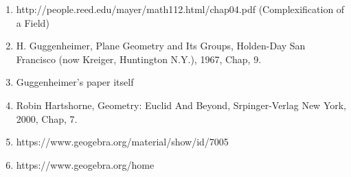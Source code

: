 \documentclass[12pt]{article}
\newcommand{\lftmat}[4]{\begin{bmatrix} {#1} & {#2} \\ {#3} & {#4} \end{bmatrix}}
\newcommand{\stanlftmat}{\lftmat{a}{b}{c}{d}}
\theoremstyle{plain}
\theoremstyle{definition}
\begin{document}

	









\newpage
{} 

\begin{enumerate}
	\item http://people.reed.edu/mayer/math112.html/chap04.pdf (Complexification of a Field)
	\item H. Guggenheimer, Plane Geometry and Its Groups, Holden-Day San Francisco (now Kreiger, Huntington N.Y.), 1967, Chap, 9.
	\item Guggenheimer's paper itself
	\item Robin Hartshorne, Geometry: Euclid And Beyond, Srpinger-Verlag New York, 2000, Chap, 7.
	\item https://www.geogebra.org/material/show/id/7005
	\item https://www.geogebra.org/home
\end{enumerate}


\end{document}
